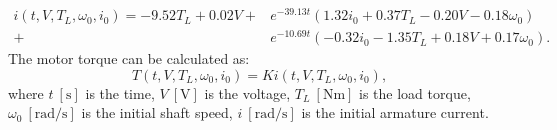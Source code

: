\documentclass[12pt,english]{article}
\begin{document}
\begin{equation}
\begin{split}
i(t,V,T_L,\omega_0,i_0) = -9.52 T_L + 0.02 V + 
&e^{-39.13 t} (1.32 i_0 + 0.37 T_L - 0.20 V - 0.18 \omega_0) \\
+&e^{-10.69 t} (-0.32 i_0 - 1.35 T_L + 0.18 V + 
0.17 \omega_0).
\end{split}
\end{equation}
The motor torque can be calculated as:
\begin{equation}
	T(t,V,T_L,\omega_0,i_0) = K i(t,V,T_L,\omega_0,i_0),
	\label{motor_load_equation}
\end{equation}
where 
	 $t~[\text{s}]$ is the time,
	 $V~[\text{V}]$ is the voltage,
	 $T_{L}~[\text{Nm}]$ is the load torque,
	 $\omega_0~[\text{rad/s}]$ is the initial shaft speed,
	 $i~[\text{rad/s}]$ is the initial armature current.
	 
\end{document}
